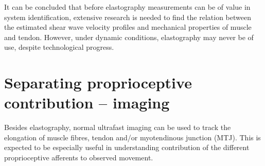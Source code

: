 It can be concluded that before elastography measurements can be of value in system identification, extensive research is needed to find the relation between the estimated shear wave velocity profiles and mechanical properties of muscle and tendon. However, under dynamic conditions, elastography may never be of use, despite technological progress. 


%
%
%
%
%


















\section{Separating proprioceptive contribution -- imaging}
Besides elastography, normal ultrafast imaging can be used to track the elongation of muscle fibres, tendon and/or  myotendinous junction (MTJ). This is expected to be especially useful in understanding contribution of the different proprioceptive afferents to observed movement. 

